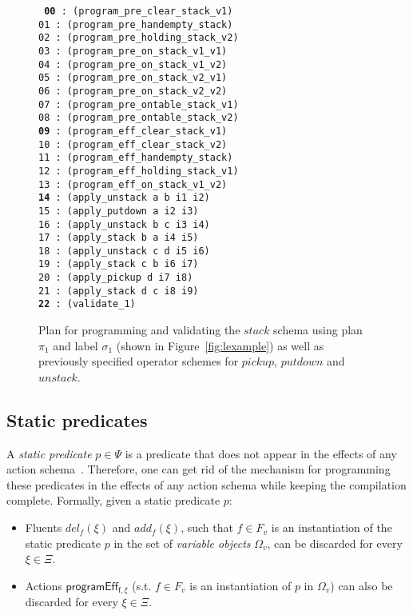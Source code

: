 \documentclass[letterpaper]{article} %
\begin{document}
\begin{figure}
{\tt\small
     {\bf 00} : (program\_pre\_clear\_stack\_v1)\\
     01 : (program\_pre\_handempty\_stack)\\
     02 : (program\_pre\_holding\_stack\_v2)\\
     03 : (program\_pre\_on\_stack\_v1\_v1)\\
     04 : (program\_pre\_on\_stack\_v1\_v2)\\
     05 : (program\_pre\_on\_stack\_v2\_v1)\\
     06 : (program\_pre\_on\_stack\_v2\_v2)\\
     07 : (program\_pre\_ontable\_stack\_v1)\\
     08 : (program\_pre\_ontable\_stack\_v2)\\
     {\bf 09} : (program\_eff\_clear\_stack\_v1)\\
    10 : (program\_eff\_clear\_stack\_v2)\\
    11 : (program\_eff\_handempty\_stack)\\
    12 : (program\_eff\_holding\_stack\_v1)\\
    13 : (program\_eff\_on\_stack\_v1\_v2)\\
    {\bf 14} : (apply\_unstack a b i1 i2)\\
    15 : (apply\_putdown a i2 i3)\\
    16 : (apply\_unstack b c i3 i4)\\
    17 : (apply\_stack b a i4 i5)\\
    18 : (apply\_unstack c d i5 i6)\\
    19 : (apply\_stack c b i6 i7)\\
    20 : (apply\_pickup d i7 i8)\\
    21 : (apply\_stack d c i8 i9)\\
    {\bf 22} : (validate\_1)
}
 \caption{\small Plan for programming and validating the $stack$ schema using plan $\pi_1$ and label $\sigma_1$ (shown in Figure~\ref{fig:lexample}) as well as previously specified operator schemes for $pickup$, $putdown$ and $unstack$.}
\label{fig:plan}
\end{figure}

\subsection{Static predicates}
A {\em static predicate} $p \in \Psi$ is a predicate that does not appear in the effects of any action schema~\cite{fox:TIM:JAIR1998}. Therefore, one can get rid of the mechanism for programming these predicates in the effects of any action schema while keeping the compilation complete. Formally, given a static predicate $p$:
\begin{itemize}
\item Fluents $del_f(\xi)$ and $add_f(\xi)$, such that $f\in F_v$ is an instantiation of the static predicate $p$ in the set of {\em variable objects} $\Omega_v$, can be discarded for every $\xi\in\Xi$.
\item Actions $\mathsf{programEff_{f,\xi}}$ (s.t. $f\in F_v$ is an instantiation of $p$ in $\Omega_v$) can also be discarded for every $\xi\in\Xi$.
\end{itemize}
\end{document}
